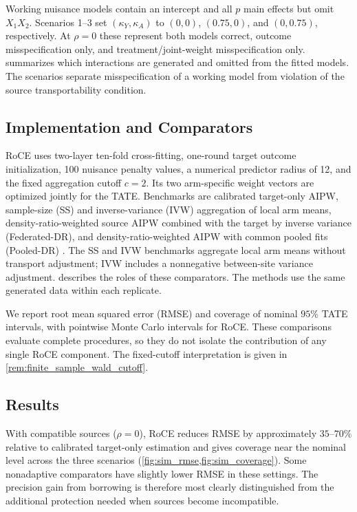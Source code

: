 \documentclass[12pt]{article}
\begin{document}
Working nuisance models contain an intercept and all $p$ main effects but omit $X_1X_2$. Scenarios 1--3 set $(\kappa_Y,\kappa_A)$ to $(0,0)$, $(0.75,0)$, and $(0,0.75)$, respectively. At $\rho=0$ these represent both models correct, outcome misspecification only, and treatment/joint-weight misspecification only.  summarizes which interactions are generated and omitted from the fitted models. The scenarios separate misspecification of a working model from violation of the source transportability condition.

\subsection{Implementation and Comparators}
RoCE uses two-layer ten-fold cross-fitting, one-round target outcome initialization, 100 nuisance penalty values, a numerical predictor radius of 12, and the fixed aggregation cutoff $c=2$. Its two arm-specific weight vectors are optimized jointly for the TATE. Benchmarks are calibrated target-only AIPW, sample-size (SS) and inverse-variance (IVW) aggregation of local arm means, density-ratio-weighted source AIPW combined with the target by inverse variance (Federated-DR), and density-ratio-weighted AIPW with common pooled fits (Pooled-DR) \citep{bang2005doubly,xiong2023federated}. The SS and IVW benchmarks aggregate local arm means without transport adjustment; IVW includes a nonnegative between-site variance adjustment.  describes the roles of these comparators. The methods use the same generated data within each replicate.

We report root mean squared error (RMSE) and coverage of nominal $95\%$ TATE intervals, with pointwise Monte Carlo intervals for RoCE. These comparisons evaluate complete procedures, so they do not isolate the contribution of any single RoCE component. The fixed-cutoff interpretation is given in \cref{rem:finite_sample_wald_cutoff}.

\subsection{Results}
With compatible sources ($\rho=0$), RoCE reduces RMSE by approximately $35$--$70\%$ relative to calibrated target-only estimation and gives coverage near the nominal level across the three scenarios (\cref{fig:sim_rmse,fig:sim_coverage}). Some nonadaptive comparators have slightly lower RMSE in these settings. The precision gain from borrowing is therefore most clearly distinguished from the additional protection needed when sources become incompatible.
\end{document}

